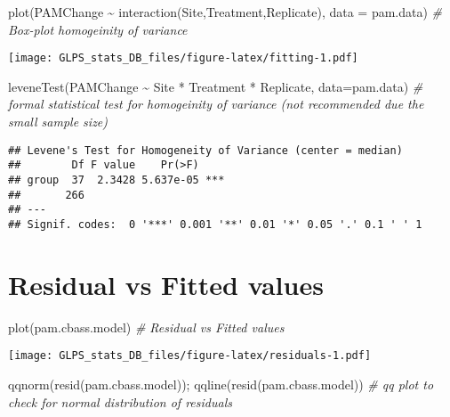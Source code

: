 \documentclass[
]{article}
\newenvironment{Shaded}{\begin{snugshade}}{\end{snugshade}}
\newcommand{\AttributeTok}[1]{\textcolor[rgb]{0.77,0.63,0.00}{#1}}
\newcommand{\CommentTok}[1]{\textcolor[rgb]{0.56,0.35,0.01}{\textit{#1}}}
\newcommand{\FunctionTok}[1]{\textcolor[rgb]{0.00,0.00,0.00}{#1}}
\newcommand{\NormalTok}[1]{#1}
\newcommand{\SpecialCharTok}[1]{\textcolor[rgb]{0.00,0.00,0.00}{#1}}
\begin{document}
\begin{Shaded}
\begin{Highlighting}[]
\FunctionTok{plot}\NormalTok{(PAMChange }\SpecialCharTok{\textasciitilde{}} \FunctionTok{interaction}\NormalTok{(Site,Treatment,Replicate), }\AttributeTok{data =}\NormalTok{ pam.data) }\CommentTok{\# Box{-}plot homogeinity of variance}
\end{Highlighting}
\end{Shaded}

\texttt{[image: GLPS\_stats\_DB\_files/figure-latex/fitting-1.pdf]}

\begin{Shaded}
\begin{Highlighting}[]
\FunctionTok{leveneTest}\NormalTok{(PAMChange }\SpecialCharTok{\textasciitilde{}}\NormalTok{ Site }\SpecialCharTok{*}\NormalTok{ Treatment }\SpecialCharTok{*}\NormalTok{ Replicate, }\AttributeTok{data=}\NormalTok{pam.data) }\CommentTok{\# formal statistical test for homogeinity of variance (not recommended due the small sample size)}
\end{Highlighting}
\end{Shaded}

\begin{verbatim}
## Levene's Test for Homogeneity of Variance (center = median)
##        Df F value    Pr(>F)    
## group  37  2.3428 5.637e-05 ***
##       266                      
## ---
## Signif. codes:  0 '***' 0.001 '**' 0.01 '*' 0.05 '.' 0.1 ' ' 1
\end{verbatim}

\hypertarget{residual-vs-fitted-values}{%
\section{Residual vs Fitted values}\label{residual-vs-fitted-values}}

\begin{Shaded}
\begin{Highlighting}[]
\FunctionTok{plot}\NormalTok{(pam.cbass.model) }\CommentTok{\# Residual vs Fitted values}
\end{Highlighting}
\end{Shaded}

\texttt{[image: GLPS\_stats\_DB\_files/figure-latex/residuals-1.pdf]}

\begin{Shaded}
\begin{Highlighting}[]
\FunctionTok{qqnorm}\NormalTok{(}\FunctionTok{resid}\NormalTok{(pam.cbass.model)); }\FunctionTok{qqline}\NormalTok{(}\FunctionTok{resid}\NormalTok{(pam.cbass.model)) }\CommentTok{\# qq plot to check for normal distribution of residuals}
\end{Highlighting}
\end{Shaded}
\end{document}
